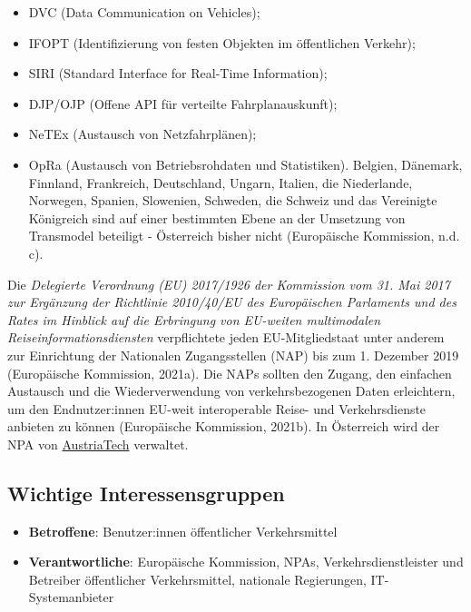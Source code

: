 \documentclass[
]{book}
\providecommand{\tightlist}{%
  \setlength{\itemsep}{0pt}\setlength{\parskip}{0pt}}
\begin{document}
\begin{itemize}
\tightlist
\item
  DVC (Data Communication on Vehicles);
\item
  IFOPT (Identifizierung von festen Objekten im öffentlichen Verkehr);
\item
  SIRI (Standard Interface for Real-Time Information);
\item
  DJP/OJP (Offene API für verteilte Fahrplanauskunft);
\item
  NeTEx (Austausch von Netzfahrplänen);
\item
  OpRa (Austausch von Betriebsrohdaten und Statistiken).
  Belgien, Dänemark, Finnland, Frankreich, Deutschland, Ungarn, Italien, die Niederlande, Norwegen, Spanien, Slowenien, Schweden, die Schweiz und das Vereinigte Königreich sind auf einer bestimmten Ebene an der Umsetzung von Transmodel beteiligt - Österreich bisher nicht (Europäische Kommission, n.d. c).
\end{itemize}

Die \emph{Delegierte Verordnung (EU) 2017/1926 der Kommission vom 31. Mai 2017 zur Ergänzung der Richtlinie 2010/40/EU des Europäischen Parlaments und des Rates im Hinblick auf die Erbringung von EU-weiten multimodalen Reiseinformationsdiensten} verpflichtete jeden EU-Mitgliedstaat unter anderem zur Einrichtung der Nationalen Zugangsstellen (NAP) bis zum 1. Dezember 2019 (Europäische Kommission, 2021a). Die NAPs sollten den Zugang, den einfachen Austausch und die Wiederverwendung von verkehrsbezogenen Daten erleichtern, um den Endnutzer:innen EU-weit interoperable Reise- und Verkehrsdienste anbieten zu können (Europäische Kommission, 2021b). In Österreich wird der NPA von \href{https://www.mobilitydata.gv.at/}{AustriaTech} verwaltet.

\hypertarget{wichtige-interessensgruppen-21}{%
\subsection*{Wichtige Interessensgruppen}\label{wichtige-interessensgruppen-21}}

\begin{itemize}
\tightlist
\item
  \textbf{Betroffene}: Benutzer:innen öffentlicher Verkehrsmittel
\item
  \textbf{Verantwortliche}: Europäische Kommission, NPAs, Verkehrsdienstleister und Betreiber öffentlicher Verkehrsmittel, nationale Regierungen, IT-Systemanbieter
\end{itemize}
\end{document}
